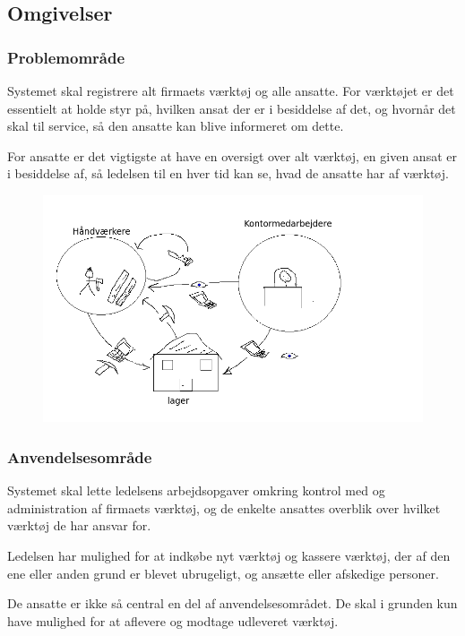 \documentclass{article}
\begin{document}
\subsection{Omgivelser}

\subsubsection{Problemområde}

Systemet skal registrere alt firmaets værktøj og alle ansatte. For værktøjet er det essentielt at holde styr på, hvilken ansat der er i besiddelse af det, og hvornår det skal til service, så den ansatte kan blive informeret om dette. 

For ansatte er det vigtigste at have en oversigt over alt værktøj, en given ansat er i besiddelse af, så ledelsen til en hver tid kan se, hvad de ansatte har af værktøj. 

\begin{figure}[htbp]
\includegraphics[scale=0.75]{./figures/systemomgivelser.png}
\end{figure}

\subsubsection{Anvendelsesområde}

Systemet skal lette ledelsens arbejdsopgaver omkring kontrol med og administration af firmaets værktøj, og de enkelte ansattes overblik over hvilket værktøj de har ansvar for. 

Ledelsen har mulighed for at indkøbe nyt værktøj og kassere værktøj, der af den ene eller anden grund er blevet ubrugeligt, og ansætte eller afskedige personer.

De ansatte er ikke så central en del af anvendelsesområdet. De skal i grunden kun have mulighed for at aflevere og modtage udleveret værktøj.
\end{document}
